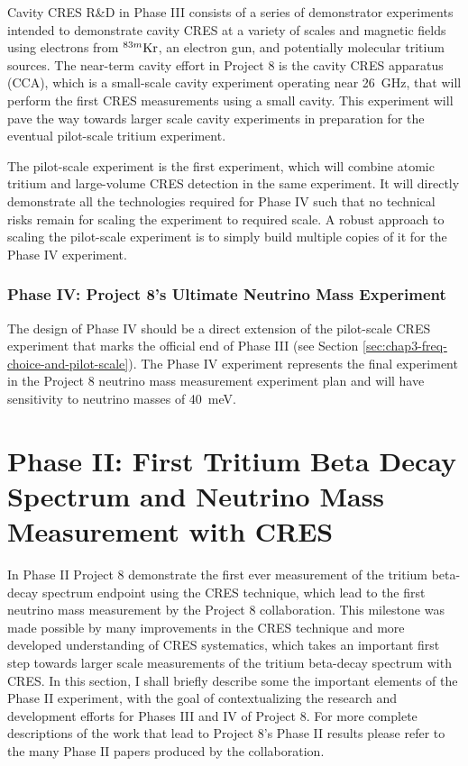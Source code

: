 Cavity CRES R\&D in Phase III consists of a series of demonstrator experiments intended to demonstrate cavity CRES at a variety of scales and magnetic fields using electrons from $^{83m}\rm{Kr}$, an electron gun, and potentially molecular tritium sources. The near-term cavity effort in Project 8 is the cavity CRES apparatus (CCA), which is a small-scale cavity experiment operating near 26~GHz, that will perform the first CRES measurements using a small cavity. This experiment will pave the way towards larger scale cavity experiments in preparation for the eventual pilot-scale tritium experiment. 

The pilot-scale experiment is the first experiment, which will combine atomic tritium and large-volume CRES detection in the same experiment. It will directly demonstrate all the technologies required for Phase IV such that no technical risks remain for scaling the experiment to required scale. A robust approach to scaling the pilot-scale experiment is to simply build multiple copies of it for the Phase IV experiment.

\subsubsection*{Phase IV: Project 8's Ultimate Neutrino Mass Experiment}

The design of Phase IV should be a direct extension of the pilot-scale CRES experiment that marks the official end of Phase III (see Section \ref{sec:chap3-freq-choice-and-pilot-scale}). The Phase IV experiment represents the final experiment in the Project 8 neutrino mass measurement experiment plan and will have sensitivity to neutrino masses of 40~meV. 

\section{Phase II: First Tritium Beta Decay Spectrum and Neutrino Mass Measurement with CRES}
\label{sec:chap3-phaseII}

In Phase II Project 8 demonstrate the first ever measurement of the tritium beta-decay spectrum endpoint using the CRES technique, which lead to the first neutrino mass measurement by the Project 8 collaboration. This milestone was made possible by many improvements in the CRES technique and more developed understanding of CRES systematics, which takes an important first step towards larger scale measurements of the tritium beta-decay spectrum with CRES. In this section, I shall briefly describe some the important elements of the Phase II experiment, with the goal of contextualizing the research and development efforts for Phases III and IV of Project 8. For more complete descriptions of the work that lead to Project 8's Phase II results please refer to the many Phase II papers produced by the collaboration.

